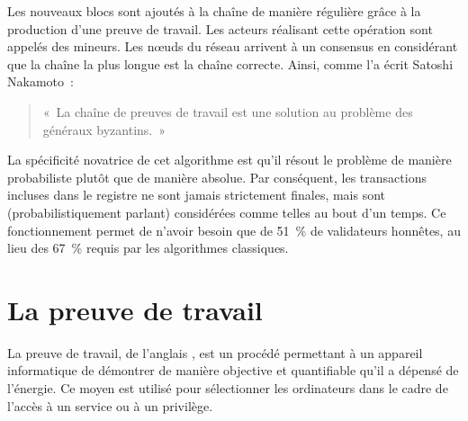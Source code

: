 Les nouveaux blocs sont ajoutés à la chaîne de manière régulière grâce à la production d'une preuve de travail. Les acteurs réalisant cette opération sont appelés des mineurs. Les nœuds du réseau arrivent à un consensus en considérant que la chaîne la plus longue est la chaîne correcte. Ainsi, comme l'a écrit Satoshi Nakamoto~:

\begin{quote}
«~La chaîne de preuves de travail est une solution au problème des généraux byzantins.~»
\end{quote}

La spécificité novatrice de cet algorithme est qu'il résout le problème de manière probabiliste plutôt que de manière absolue. Par conséquent, les transactions incluses dans le registre ne sont jamais strictement finales, mais sont (probabilistiquement parlant) considérées comme telles au bout d'un temps. Ce fonctionnement permet de n'avoir besoin que de 51~\% de validateurs honnêtes, au lieu des 67~\% requis par les algorithmes classiques.



\section*{La preuve de travail}


La preuve de travail, de l'anglais , est un procédé permettant à un appareil informatique de démontrer de manière objective et quantifiable qu'il a dépensé de l'énergie. Ce moyen est utilisé pour sélectionner les ordinateurs dans le cadre de l'accès à un service ou à un privilège.


